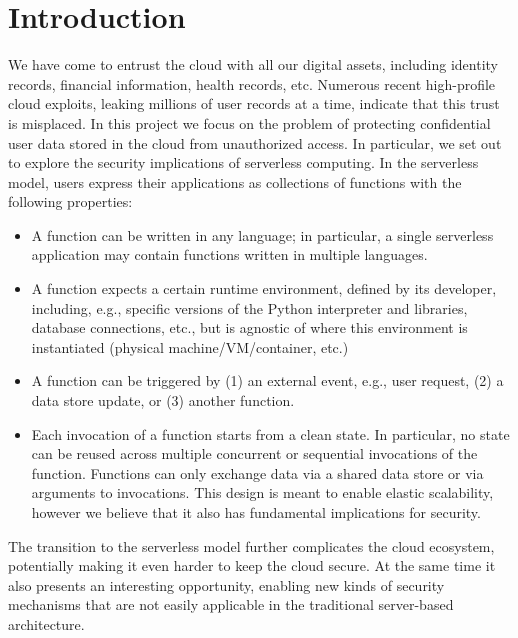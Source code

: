 \section{Introduction} %
\label{sec:introduction}

We have come to entrust the cloud with all our digital assets, including identity records, financial information, health records, etc. Numerous recent high-profile cloud exploits, leaking millions of user records at a time, indicate that this trust is misplaced. In this project we focus on the problem of protecting confidential user data stored in the cloud from unauthorized access. In particular, we set out to explore the security implications of serverless computing. In the serverless model, users express their applications as collections of functions with the following properties:

\begin{itemize}
    \item A function can be written in any language; in particular, a single serverless application may contain functions written in multiple languages.

    \item A function expects a certain runtime environment, defined by its developer, including, e.g., specific versions of the Python interpreter and libraries, database connections, etc., but is agnostic of where this environment is instantiated (physical machine/VM/container, etc.)

    \item A function can be triggered by (1) an external event, e.g., user request, (2) a data store update, or (3) another function.

    \item Each invocation of a function starts from a clean state. In particular, no state can be reused across multiple concurrent or sequential invocations of the function. Functions can only exchange data via a shared data store or via arguments to invocations. This design is meant to enable elastic scalability, however we believe that it also has fundamental implications for security.

\end{itemize}


The transition to the serverless model further complicates the cloud ecosystem, potentially making it even harder to keep the cloud secure. At the same time it also presents an interesting opportunity, enabling new kinds of security mechanisms that are not easily applicable in the traditional server-based architecture.

